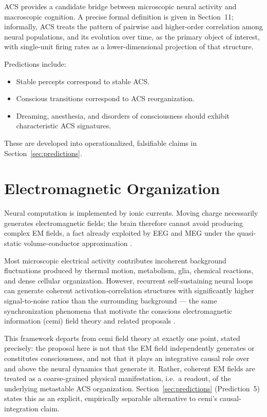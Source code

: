 \documentclass[11pt]{article}
\begin{document}
ACS provides a candidate bridge between microscopic neural activity and macroscopic cognition. A precise formal definition is given in Section~11; informally, ACS treats the pattern of pairwise and higher-order correlation among neural populations, and its evolution over time, as the primary object of interest, with single-unit firing rates as a lower-dimensional projection of that structure.

Predictions include:
\begin{itemize}[nosep]
  \item Stable percepts correspond to stable ACS.
  \item Conscious transitions correspond to ACS reorganization.
  \item Dreaming, anesthesia, and disorders of consciousness should exhibit characteristic ACS signatures.
\end{itemize}

These are developed into operationalized, falsifiable claims in Section~\ref{sec:predictions}.

\section{Electromagnetic Organization}

Neural computation is implemented by ionic currents. Moving charge necessarily generates electromagnetic fields; the brain therefore cannot avoid producing complex EM fields, a fact already exploited by EEG and MEG under the quasi-static volume-conductor approximation \citep*{nunez2006}.

Most microscopic electrical activity contributes incoherent background fluctuations produced by thermal motion, metabolism, glia, chemical reactions, and dense cellular organization. However, recurrent self-sustaining neural loops can generate coherent activation-correlation structures with significantly higher signal-to-noise ratios than the surrounding background --- the same synchronization phenomena that motivate the conscious electromagnetic information (cemi) field theory \citep*{mcfadden2002a,mcfadden2002b,mcfadden2020} and related proposals \citep*{pockett2000}.

This framework departs from cemi field theory at exactly one point, stated precisely: the proposal here is not that the EM field independently generates or constitutes consciousness, and not that it plays an integrative causal role over and above the neural dynamics that generate it. Rather, coherent EM fields are treated as a coarse-grained physical manifestation, i.e.\ a readout, of the underlying metastable ACS organization. Section~\ref{sec:predictions} (Prediction~5) states this as an explicit, empirically separable alternative to cemi's causal-integration claim.
\end{document}
